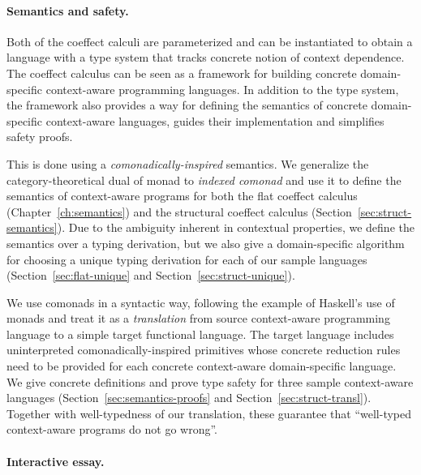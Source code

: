 
\paragraph{Semantics and safety.}

Both of the coeffect calculi are parameterized and can be instantiated to obtain a language with
a type system that tracks concrete notion of context dependence. The coeffect calculus can be seen
as a framework for building concrete domain-specific context-aware programming languages. In
addition to the type system, the framework also provides a way for defining the semantics of
concrete domain-specific context-aware languages, guides their implementation and simplifies
safety proofs.

This is done using a \emph{comonadically-inspired} semantics. We generalize the category-theoretical
dual of monad to \emph{indexed comonad} and use it to define the semantics of context-aware
programs for both the flat coeffect calculus (Chapter~\ref{ch:semantics}) and the structural coeffect
calculus (Section~\ref{sec:struct-semantics}). Due to the ambiguity inherent in contextual properties,
we define the semantics over a typing derivation, but we also give a domain-specific algorithm for
choosing a unique typing derivation for each of our sample languages (Section~\ref{sec:flat-unique}
and Section~\ref{sec:struct-unique}).

We use comonads in a syntactic way, following the example of Haskell's use of monads and treat
it as a \emph{translation} from source context-aware programming language to a simple target
functional language. The target language includes uninterpreted comonadically-inspired primitives
whose concrete reduction rules need to be provided for each concrete context-aware domain-specific
language. We give concrete definitions and prove type safety for three sample context-aware
languages (Section~\ref{sec:semantics-proofs} and Section~\ref{sec:struct-transl}). Together with
well-typedness of our translation, these guarantee that ``well-typed context-aware programs do
not go wrong''.


\paragraph{Interactive essay.}

